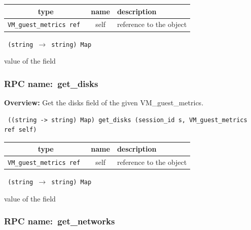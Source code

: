  
\vspace{0.3cm}
\begin{tabular}{|c|c|p{7cm}|}
 \hline
{\bf type} & {\bf name} & {\bf description} \\ \hline
{\tt VM\_guest\_metrics ref } & self & reference to the object \\ \hline 

\end{tabular}

\vspace{0.3cm}

{\tt 
(string $\rightarrow$ string) Map
}


value of the field
\vspace{0.3cm}
\vspace{0.3cm}
\vspace{0.3cm}
\subsubsection{RPC name:~get\_disks}

{\bf Overview:} 
Get the disks field of the given VM\_guest\_metrics.

\begin{verbatim} ((string -> string) Map) get_disks (session_id s, VM_guest_metrics ref self)\end{verbatim}



 
\vspace{0.3cm}
\begin{tabular}{|c|c|p{7cm}|}
 \hline
{\bf type} & {\bf name} & {\bf description} \\ \hline
{\tt VM\_guest\_metrics ref } & self & reference to the object \\ \hline 

\end{tabular}

\vspace{0.3cm}

{\tt 
(string $\rightarrow$ string) Map
}


value of the field
\vspace{0.3cm}
\vspace{0.3cm}
\vspace{0.3cm}
\subsubsection{RPC name:~get\_networks}

